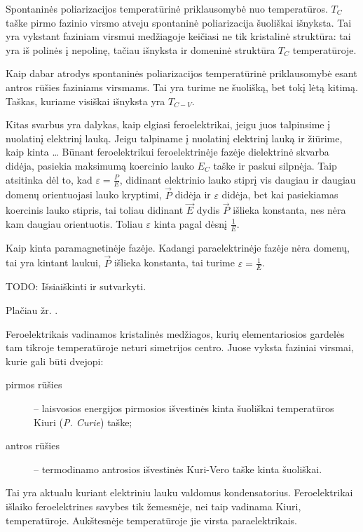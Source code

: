 \begin{note}
  Spontaninės poliarizacijos temperatūrinė priklausomybė nuo
  temperatūros. $T_{C}$ taške pirmo fazinio virsmo atveju
  spontaninė poliarizacija šuoliškai išnyksta. Tai yra
  vykstant faziniam virsmui medžiagoje keičiasi ne tik
  kristalinė struktūra: tai yra iš polinės į nepolinę, tačiau
  išnyksta ir domeninė struktūra $T_{C}$ temperatūroje.

  Kaip dabar atrodys spontaninės poliarizacijos temperatūrinė
  priklausomybė esant antros rūšies faziniams virsmams. Tai
  yra turime ne šuolišką, bet tokį lėtą kitimą. Taškas,
  kuriame visiškai išnyksta yra $T_{C-V}$.

  Kitas svarbus yra dalykas, kaip elgiasi feroelektrikai, jeigu
  juos talpinsime į nuolatinį elektrinį lauką. Jeigu talpiname
  į nuolatinį elektrinį lauką ir žiūrime, kaip kinta …
  Būnant feroelektrikui feroelektrinėje fazėje dielektrinė
  skvarba didėja, pasiekia maksimumą koercinio lauko $E_{C}$
  taške ir paskui silpnėja. Taip atsitinka dėl to, kad
  $\varepsilon = \frac{P}{E}$, didinant elektrinio lauko
  stiprį vis daugiau ir daugiau domenų orientuojasi lauko kryptimi,
  $\vec{P}$ didėja ir $\varepsilon$ didėja, bet kai pasiekiamas
  koercinis lauko stipris, tai toliau didinant $\vec{E}$ dydis
  $\vec{P}$ išlieka konstanta, nes nėra kam daugiau orientuotis.
  Toliau $\varepsilon$ kinta pagal dėsnį $\frac{1}{E}$.

  Kaip kinta paramagnetinėje fazėje. Kadangi paraelektrinėje
  fazėje nėra domenų, tai yra kintant laukui, $\vec{P}$ išlieka
  konstanta, tai turime $\varepsilon = \frac{1}{E}$.




\end{note}

TODO: Išsiaiškinti ir sutvarkyti.

Plačiau žr. \cite[41p.]{elektra-magnetizmas}.

Feroelektrikais vadinamos kristalinės medžiagos, kurių
elementariosios gardelės tam tikroje temperatūroje neturi simetrijos
centro. Juose vyksta faziniai virsmai, kurie gali būti dvejopi:
\begin{description}
  \item[pirmos rūšies] – laisvosios energijos pirmosios išvestinės
    kinta šuoliškai temperatūros Kiuri (\emph{P. Curie}) taške;
  \item[antros rūšies] – termodinamo antrosios išvestinės
    Kuri-Vero taške kinta šuoliškai.
\end{description}
Tai yra aktualu kuriant elektriniu lauku valdomus kondensatorius.
Feroelektrikai išlaiko feroelektrines savybes tik žemesnėje, nei
taip vadinama Kiuri, temperatūroje. Aukštesnėje temperatūroje
jie virsta paraelektrikais.

